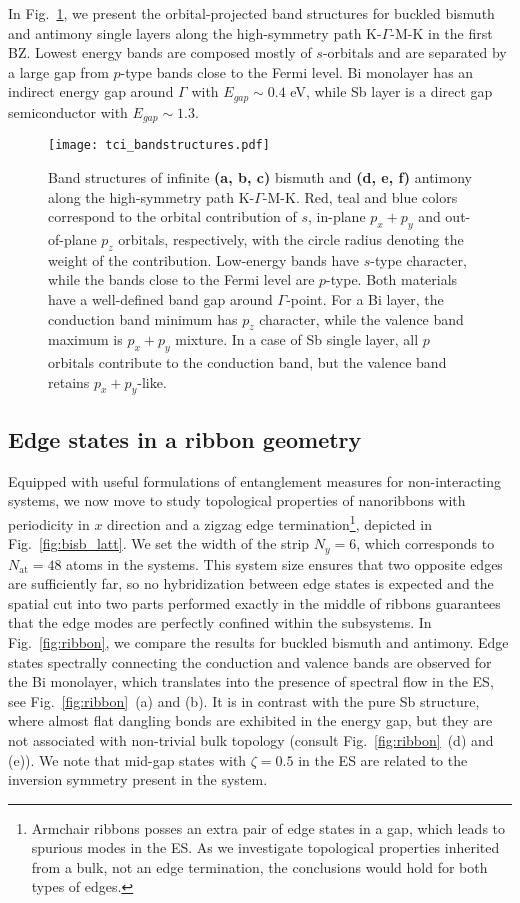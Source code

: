 In Fig.~\ref{fig:bs_bisb}, we present the orbital-projected band structures for buckled bismuth and antimony single layers along the high-symmetry path K-$ \Gamma$-M-K in the first BZ. Lowest energy bands are composed mostly of $s$-orbitals and are separated by a large gap from $p$-type bands close to the Fermi level. Bi monolayer has an indirect energy gap around $\Gamma$ with $E_{gap} \sim 0.4$ eV, while Sb layer is a direct gap semiconductor with $E_{gap} \sim 1.3$.

\begin{figure}[H]
\centering
\texttt{[image: tci\_bandstructures.pdf]}
\caption[Band structures of bismuth and antimony monolayers]{Band structures of infinite \textbf{(a, b, c)} bismuth and \textbf{(d, e, f)} antimony along the high-symmetry path K-$ \Gamma$-M-K. Red, teal and blue colors correspond to the orbital contribution of $s$, in-plane $p_x + p_y$ and out-of-plane $p_z$ orbitals, respectively, with the circle radius denoting the weight of the contribution. Low-energy bands have $s$-type character, while the bands close to the Fermi level are $p$-type. Both materials have a well-defined band gap around $\Gamma$-point. For a Bi layer, the conduction band minimum has $p_z$ character, while the valence band maximum is $p_x + p_y$ mixture. In a case of Sb single layer, all $p$ orbitals contribute to the conduction band, but the valence band retains $p_x + p_y$-like.}
\label{fig:bs_bisb}
\end{figure}

\subsection{Edge states in a ribbon geometry}
Equipped with useful formulations of entanglement measures for non-interacting systems, we now move to study topological properties of nanoribbons with periodicity in $x$ direction and a zigzag edge termination\footnote{Armchair ribbons posses an extra pair of edge states in a gap, which leads to spurious modes in the ES. As we investigate topological properties inherited from a bulk, not an edge termination, the conclusions would hold for both types of edges.}, depicted in Fig.~\ref{fig:bisb_latt}. We set the width of the strip $N_y = 6$, which corresponds to $N_{\mathrm{at}} = 48$ atoms in the systems. This system size ensures that two opposite edges are sufficiently far, so no hybridization between edge states is expected and the spatial cut into two parts performed exactly in the middle of ribbons guarantees that the edge modes are perfectly confined within the subsystems. In Fig.~\ref{fig:ribbon}, we compare the results for buckled bismuth and antimony. Edge states spectrally connecting the conduction and valence bands are observed for the Bi monolayer, which translates into the presence of spectral flow in the ES, see Fig.~\ref{fig:ribbon}~(a) and (b). It is in contrast with the pure Sb structure, where almost flat dangling bonds are exhibited in the energy gap, but they are not associated with non-trivial bulk topology (consult Fig.~\ref{fig:ribbon}~(d) and (e)). We note that mid-gap states with $\zeta = 0.5$ in the ES are related to the inversion symmetry present in the system. 

